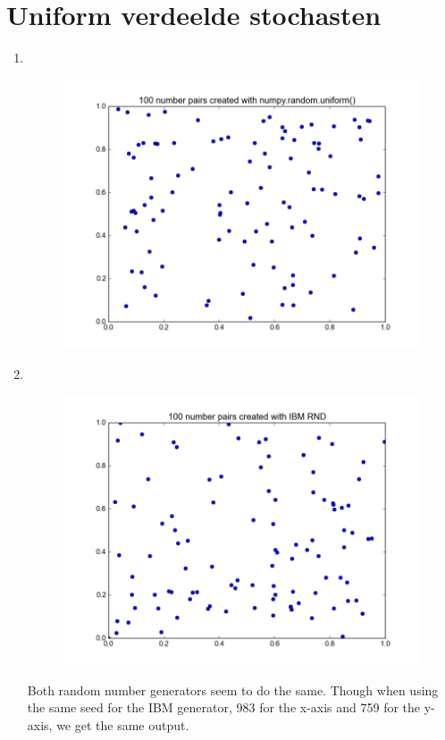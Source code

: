 \documentclass[a4paper,12px]{article}
\begin{document}
\section{Uniform verdeelde stochasten}
\begin{enumerate}
    \item $ $
        \begin{figure}[!h]
            \centering
            \includegraphics[width=\textwidth]{uniform.png}
        \end{figure}
        \FloatBarrier
    \item $ $
        \begin{figure}[!h]
            \centering
            \includegraphics[width=\textwidth]{ibm.png}
        \end{figure}
        \FloatBarrier
        Both random number generators seem to do the same. Though when using
        the same seed for the IBM generator, 983 for the x-axis and 759 for
        the y-axis, we get the same output.


\end{enumerate}
\end{document}
